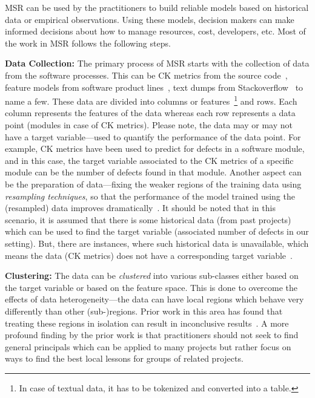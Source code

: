 \documentclass[table, xcdraw, sigconf,review, anonymous]{acmart}
\begin{document}
MSR can be used by the practitioners to build reliable models based on historical data or empirical observations. Using these models, decision makers can make informed decisions about how to manage resources, cost, developers, etc. Most of the work in MSR follows the following steps.

\noindent\textbf{Data Collection:} The primary process of MSR starts with the collection of data from the software processes. This can be CK metrics from the source code~\cite{subramanyam2003empirical}, feature models from software product lines~\cite{sayyad2013value}, text dumps from Stackoverflow~\cite{agrawalwrong} to name a few. These data are divided into columns or features~\footnote{In case of textual data, it has to be tokenized and converted into a table.} and rows. Each column represents the features of the data whereas each row represents a data point (modules in case of CK metrics). Please note, the data may or may not have a target variable---used to quantify the performance of the data point. For example, CK metrics have been used to predict for defects in a software module, and in this case, the target variable associated to the CK metrics of a specific module can be the number of defects found in that module. Another aspect can be the preparation of data---fixing the weaker regions of the
training data using \textit{resampling techniques}, so that the performance of the model trained using the (resampled) data improves dramatically~\cite{agrawal2017better, bennin2017mahakil}. It should be noted that in this scenario, it is assumed that there is some historical data (from past projects) which can be used to find the target variable (associated number of defects in our setting). But, there are instances, where such historical data is unavailable, which means the data (CK metrics) does not have a corresponding target variable~\cite{yang2016effort}. 

\noindent\textbf{Clustering:} The data can be \textit{clustered} into various sub-classes either based on the target variable or based on the feature space. This is done to overcome the effects of data heterogeneity---the data can have local regions which behave very differently than other (sub-)regions. Prior work in this area has found that treating these regions in isolation can result in inconclusive results~\cite{menzies2011local, menzies2013local, bettenburg2012think}. A more profound finding by the prior work is that practitioners should not seek to find general principals which can be applied to many projects but rather focus on ways to find the best local lessons for groups of related projects. 
\end{document}
